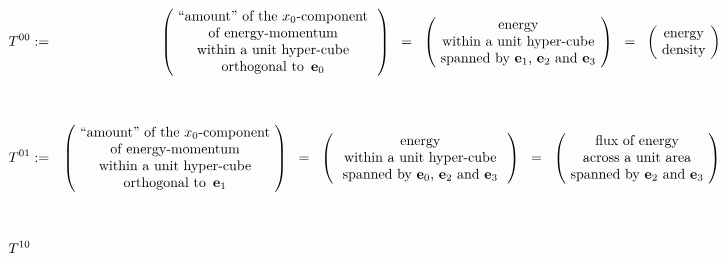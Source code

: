 \begin{eqnarray*}
T^{00}
& := &
	\left(\!
		\begin{array}{c}
		\textnormal{``amount'' of the $x_{0}$-component}
		\\
		\textnormal{of energy-momentum}
		\\
		\textnormal{within a unit hyper-cube}
		\\
		\textnormal{orthogonal to \,$\mathbf{e}_{0}$}
		\end{array}
		\,\right)
\;\; = \;\;
	\left(\!
		\begin{array}{c}
		\textnormal{energy}
		\\
		\textnormal{within a unit hyper-cube}
		\\
		\textnormal{spanned by $\mathbf{e}_{1}$, $\mathbf{e}_{2}$ and $\mathbf{e}_{3}$}
		\end{array}
		\!\right)
\;\; = \;\;
	\left(\!
		\begin{array}{c}
		\textnormal{energy}
		\\
		\textnormal{density}
		\end{array}
		\!\right)
\\ \\ \\
T^{01}
& := &
	\left(\!
		\begin{array}{c}
		\textnormal{``amount'' of the $x_{0}$-component}
		\\
		\textnormal{of energy-momentum}
		\\
		\textnormal{within a unit hyper-cube}
		\\
		\textnormal{orthogonal to \,$\mathbf{e}_{1}$}
		\end{array}
		\!\right)
\;\; = \;\;
	\left(\,
		\begin{array}{c}
		\textnormal{energy}
		\\
		\textnormal{within a unit hyper-cube}
		\\
		\textnormal{spanned by $\mathbf{e}_{0}$, $\mathbf{e}_{2}$ and $\mathbf{e}_{3}$}
		\end{array}
		\,\right)
\;\; = \;\;
	\left(\!
		\begin{array}{c}
		\textnormal{flux of energy}
		\\
		\textnormal{across a unit area}
		\\
		\textnormal{spanned by $\mathbf{e}_{2}$ and $\mathbf{e}_{3}$}
		\end{array}
		\!\right)
\\ \\ \\
T^{10}

\end{eqnarray*}
